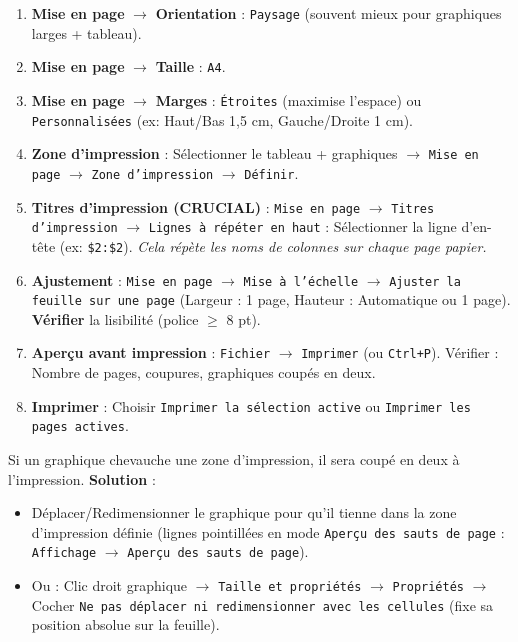 \documentclass[11pt]{article}
\begin{document}
\begin{methode}
\begin{enumerate}
    \item \textbf{Mise en page} $\to$ \textbf{Orientation} : \texttt{Paysage} (souvent mieux pour graphiques larges + tableau).
    \item \textbf{Mise en page} $\to$ \textbf{Taille} : \texttt{A4}.
    \item \textbf{Mise en page} $\to$ \textbf{Marges} : \texttt{Étroites} (maximise l'espace) ou \texttt{Personnalisées} (ex: Haut/Bas 1,5 cm, Gauche/Droite 1 cm).
    \item \textbf{Zone d'impression} : Sélectionner le tableau + graphiques $\to$ \texttt{Mise en page} $\to$ \texttt{Zone d'impression} $\to$ \texttt{Définir}.
    \item \textbf{Titres d'impression (CRUCIAL)} : \texttt{Mise en page} $\to$ \texttt{Titres d'impression} $\to$ \texttt{Lignes à répéter en haut} : Sélectionner la ligne d'en-tête (ex: \texttt{\$2:\$2}). \textit{Cela répète les noms de colonnes sur chaque page papier.}
    \item \textbf{Ajustement} : \texttt{Mise en page} $\to$ \texttt{Mise à l'échelle} $\to$ \texttt{Ajuster la feuille sur une page} (Largeur : 1 page, Hauteur : Automatique ou 1 page). \textbf{Vérifier} la lisibilité (police $\ge$ 8 pt).
    \item \textbf{Aperçu avant impression} : \texttt{Fichier} $\to$ \texttt{Imprimer} (ou \texttt{Ctrl+P}). Vérifier : Nombre de pages, coupures, graphiques coupés en deux.
    \item \textbf{Imprimer} : Choisir \texttt{Imprimer la sélection active} ou \texttt{Imprimer les pages actives}.
\end{enumerate}
\end{methode}

\begin{attention}
Si un graphique chevauche une zone d'impression, il sera coupé en deux à l'impression.
\textbf{Solution} :
\begin{itemize}
    \item Déplacer/Redimensionner le graphique pour qu'il tienne dans la zone d'impression définie (lignes pointillées en mode \texttt{Aperçu des sauts de page} : \texttt{Affichage} $\to$ \texttt{Aperçu des sauts de page}).
    \item Ou : Clic droit graphique $\to$ \texttt{Taille et propriétés} $\to$ \texttt{Propriétés} $\to$ Cocher \texttt{Ne pas déplacer ni redimensionner avec les cellules} (fixe sa position absolue sur la feuille).
\end{itemize}
\end{attention}
\end{document}
